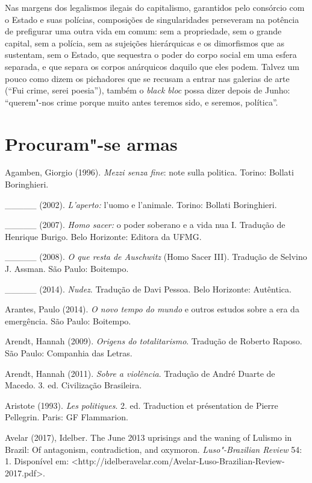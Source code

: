 Nas margens dos legalismos ilegais do capitalismo, garantidos pelo
consórcio com o Estado e suas polícias, composições de singularidades
perseveram na potência de prefigurar uma outra vida em comum: sem a
propriedade, sem o grande capital, sem a polícia, sem as sujeições
hierárquicas e os dimorfismos que as sustentam, sem o Estado, que
sequestra o poder do corpo social em uma esfera separada, e que separa
os corpos anárquicos daquilo que eles podem. Talvez um pouco como dizem
os pichadores que se recusam a entrar nas galerias de arte (``Fui crime,
serei poesia''), também o \emph{black bloc} possa dizer depois de Junho:
``querem"-nos crime porque muito antes teremos sido, e seremos,
política''.

\chapter{Procuram"-se armas}

Agamben, Giorgio (1996). \emph{Mezzi senza fine}: note sulla politica.
Torino: Bollati Boringhieri.

\_\_\_\_\_ (2002). \emph{L'aperto: }l'uomo e l'animale. Torino: Bollati
Boringhieri.

\_\_\_\_\_ (2007). \emph{Homo sacer: }o poder soberano e a vida nua I.
Tradução de Henrique Burigo. Belo Horizonte: Editora da UFMG.

\_\_\_\_\_ (2008). \emph{O que resta de Auschwitz} (Homo Sacer III).
Tradução de Selvino J. Assman. São Paulo: Boitempo.

\_\_\_\_\_ (2014). \emph{Nudez}. Tradução de Davi Pessoa. Belo
Horizonte: Autêntica.

Arantes, Paulo (2014). \emph{O novo tempo do mundo }e outros estudos
sobre a era da emergência. São Paulo: Boitempo.

Arendt, Hannah (2009). \emph{Origens do totalitarismo}. Tradução de
Roberto Raposo. São Paulo: Companhia das Letras.

Arendt, Hannah (2011). \emph{Sobre a violência}. Tradução de André
Duarte de Macedo. 3. ed. Civilização Brasileira.

Aristote (1993). \emph{Les politiques}. 2. ed. Traduction et
présentation de Pierre Pellegrin. Paris: GF Flammarion.

Avelar (2017), Idelber. The June 2013 uprisings and the waning of
Lulismo in Brazil: Of antagonism, contradiction, and oxymoron.
\emph{Luso"-Brazilian Review} 54: 1. Disponível em:
\textless{}http://idelberavelar.com/Avelar-Luso-Brazilian-Review-2017.pdf\textgreater{}.

